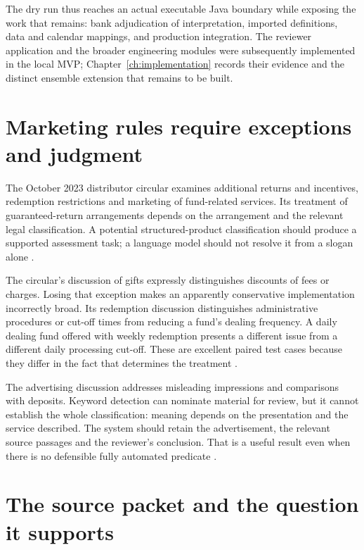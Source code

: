 \documentclass[12pt,a4paper,oneside,openany]{book}
\begin{document}
The dry run thus reaches an actual executable Java boundary while exposing
the work that remains: bank adjudication of interpretation, imported definitions,
data and calendar mappings, and production integration. The reviewer application and the broader
engineering modules were subsequently implemented in the local MVP;
Chapter~\ref{ch:implementation} records their evidence and the distinct ensemble
extension that remains to be built.

\section{Marketing rules require exceptions and judgment}
\label{merge:P-01-problem:04}


The October 2023 distributor circular examines additional returns and incentives,
redemption restrictions and marketing of fund-related services. Its treatment of
guaranteed-return arrangements depends on the arrangement and the relevant legal
classification. A potential structured-product classification should produce a
supported assessment task; a language model should not resolve it from a slogan
alone \citep[paras.~5--11]{sfcmarketing}.

The circular's discussion of gifts expressly distinguishes discounts of fees or
charges. Losing that exception makes an apparently conservative implementation
incorrectly broad. Its redemption discussion distinguishes administrative
procedures or cut-off times from reducing a fund's dealing frequency. A daily
dealing fund offered with weekly redemption presents a different issue from a
different daily processing cut-off. These are excellent paired test cases because
they differ in the fact that determines the treatment
\citep[paras.~9--14]{sfcmarketing}.

The advertising discussion addresses misleading impressions and comparisons with
deposits. Keyword detection can nominate material for review, but it cannot
establish the whole classification: meaning depends on the presentation and the
service described. The system should retain the advertisement, the relevant
source passages and the reviewer's conclusion. That is a useful result even when
there is no defensible fully automated predicate
\citep[paras.~15--17]{sfcmarketing}.

\section{The source packet and the question it supports}
\label{merge:M02:00}
\end{document}
